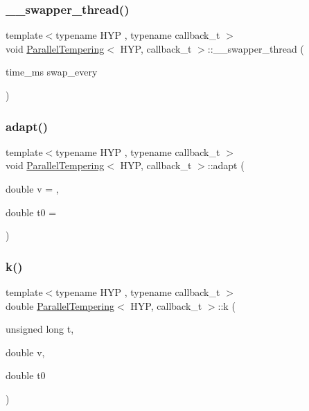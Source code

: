 \subsubsection{\texorpdfstring{\+\_\+\+\_\+swapper\+\_\+thread()}{\_\_swapper\_thread()}}
{\footnotesize\ttfamily template$<$typename H\+YP , typename callback\+\_\+t $>$ \\
void \hyperlink{class_parallel_tempering}{Parallel\+Tempering}$<$ H\+YP, callback\+\_\+t $>$\+::\+\_\+\+\_\+swapper\+\_\+thread (\begin{DoxyParamCaption}\item[{time\+\_\+ms}]{swap\+\_\+every }\end{DoxyParamCaption})\hspace{0.3cm}{\ttfamily [inline]}}

\mbox{\label{class_parallel_tempering_a673feff316b65cad63f56ceb81b128ae}} 
\subsubsection{\texorpdfstring{adapt()}{adapt()}}
{\footnotesize\ttfamily template$<$typename H\+YP , typename callback\+\_\+t $>$ \\
void \hyperlink{class_parallel_tempering}{Parallel\+Tempering}$<$ H\+YP, callback\+\_\+t $>$\+::adapt (\begin{DoxyParamCaption}\item[{double}]{v = {},  }\item[{double}]{t0 = {} }\end{DoxyParamCaption})\hspace{0.3cm}{\ttfamily [inline]}}

\mbox{\label{class_parallel_tempering_a439c50d3f616319803d4ab83804d1ae0}} 
\subsubsection{\texorpdfstring{k()}{k()}}
{\footnotesize\ttfamily template$<$typename H\+YP , typename callback\+\_\+t $>$ \\
double \hyperlink{class_parallel_tempering}{Parallel\+Tempering}$<$ H\+YP, callback\+\_\+t $>$\+::k (\begin{DoxyParamCaption}\item[{unsigned long}]{t,  }\item[{double}]{v,  }\item[{double}]{t0 }\end{DoxyParamCaption})\hspace{0.3cm}{\ttfamily [inline]}}

